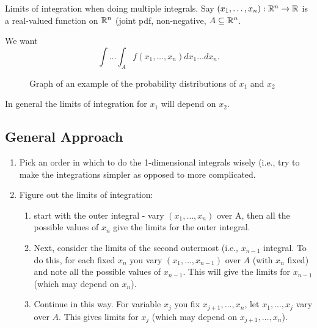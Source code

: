 
Limits of integration when doing multiple integrals. Say $\left( x_1, \ldots, x_{n} \right) : \mathbb{R}^{n} \to \mathbb{R} $ is a real-valued function on $\mathbb{R}^{n}$ (joint pdf, non-negative, $A \subseteq \mathbb{R}^{n}$. 

We want 
\[
	\int \ldots \int_{A} f\left( x_1, \ldots, x_{n} \right) dx_1 \ldots dx_{n}
.\] 
\begin{figure}[ht]
    \centering
    \caption{Graph of an example of the probability distributions of $x_1$ and $x_2$}
    \label{fig:xonextwograph}
\end{figure}


In general the limits of integration for $x_1$ will depend on $x_2$. 

\subsection{General Approach}

\begin{enumerate}
	\item Pick an order in which to do the 1-dimensional integrals wisely (i.e., try to make the integrations simpler as opposed to more complicated. 
	\item Figure out the limits of integration: 
		\begin{enumerate}
			\item start with the outer integral - vary $(x_1, \ldots, x_{n})$ over A, then all the possible values of $x_{n}$ give the limits for the outer integral. 
			\item Next, consider the limits of the second outermost (i.e., $x_{n-1}$ integral. To do this, for each fixed $x_{n}$ you vary $\left( x_1, \ldots, x_{n-1} \right) $ over $A$ (with $x_{n}$ fixed) and note all the possible values of $x_{n-1}$. This will give the limits for $x_{n-1}$ (which may depend on $x_{n}$).
			\item Continue in this way. For variable $x_{j}$ you fix $x_{j+1}, \ldots, x_{n}$, let $x_1, \ldots, x_{j}$ vary over $A$. This gives limits for $x_{j}$ (which may depend on $x_{j + 1}, \ldots, x_{n}$). 
		\end{enumerate}
\end{enumerate}

